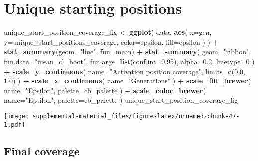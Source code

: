 \documentclass[]{book}
\newenvironment{Shaded}{\begin{snugshade}}{\end{snugshade}}
\newcommand{\DataTypeTok}[1]{\textcolor[rgb]{0.13,0.29,0.53}{#1}}
\newcommand{\DecValTok}[1]{\textcolor[rgb]{0.00,0.00,0.81}{#1}}
\newcommand{\FloatTok}[1]{\textcolor[rgb]{0.00,0.00,0.81}{#1}}
\newcommand{\KeywordTok}[1]{\textcolor[rgb]{0.13,0.29,0.53}{\textbf{#1}}}
\newcommand{\NormalTok}[1]{#1}
\newcommand{\OperatorTok}[1]{\textcolor[rgb]{0.81,0.36,0.00}{\textbf{#1}}}
\newcommand{\StringTok}[1]{\textcolor[rgb]{0.31,0.60,0.02}{#1}}
\begin{document}
\hypertarget{unique-starting-positions-3}{%
\section{Unique starting positions}\label{unique-starting-positions-3}}

\begin{Shaded}
\begin{Highlighting}[]
\NormalTok{unique_start_position_coverage_fig <-}\StringTok{ }\KeywordTok{ggplot}\NormalTok{(}
\NormalTok{    data,}
    \KeywordTok{aes}\NormalTok{(}
      \DataTypeTok{x=}\NormalTok{gen,}
      \DataTypeTok{y=}\NormalTok{unique_start_positions_coverage,}
      \DataTypeTok{color=}\NormalTok{epsilon,}
      \DataTypeTok{fill=}\NormalTok{epsilon}
\NormalTok{    )}
\NormalTok{  ) }\OperatorTok{+}
\StringTok{  }\KeywordTok{stat_summary}\NormalTok{(}\DataTypeTok{geom=}\StringTok{"line"}\NormalTok{, }\DataTypeTok{fun=}\NormalTok{mean) }\OperatorTok{+}
\StringTok{  }\KeywordTok{stat_summary}\NormalTok{(}
    \DataTypeTok{geom=}\StringTok{"ribbon"}\NormalTok{,}
    \DataTypeTok{fun.data=}\StringTok{"mean_cl_boot"}\NormalTok{,}
    \DataTypeTok{fun.args=}\KeywordTok{list}\NormalTok{(}\DataTypeTok{conf.int=}\FloatTok{0.95}\NormalTok{),}
    \DataTypeTok{alpha=}\FloatTok{0.2}\NormalTok{,}
    \DataTypeTok{linetype=}\DecValTok{0}
\NormalTok{  ) }\OperatorTok{+}
\StringTok{  }\KeywordTok{scale_y_continuous}\NormalTok{(}
    \DataTypeTok{name=}\StringTok{"Activation position coverage"}\NormalTok{,}
    \DataTypeTok{limits=}\KeywordTok{c}\NormalTok{(}\FloatTok{0.0}\NormalTok{, }\FloatTok{1.0}\NormalTok{)}
\NormalTok{  ) }\OperatorTok{+}
\StringTok{  }\KeywordTok{scale_x_continuous}\NormalTok{(}
    \DataTypeTok{name=}\StringTok{"Generations"}
\NormalTok{  ) }\OperatorTok{+}
\StringTok{  }\KeywordTok{scale_fill_brewer}\NormalTok{(}
    \DataTypeTok{name=}\StringTok{"Epsilon"}\NormalTok{,}
    \DataTypeTok{palette=}\NormalTok{cb_palette}
\NormalTok{  ) }\OperatorTok{+}
\StringTok{  }\KeywordTok{scale_color_brewer}\NormalTok{(}
    \DataTypeTok{name=}\StringTok{"Epsilon"}\NormalTok{,}
    \DataTypeTok{palette=}\NormalTok{cb_palette}
\NormalTok{  )}
\NormalTok{unique_start_position_coverage_fig}
\end{Highlighting}
\end{Shaded}

\texttt{[image: supplemental-material\_files/figure-latex/unnamed-chunk-47-1.pdf]}

\hypertarget{final-coverage}{%
\subsection{Final coverage}\label{final-coverage}}
\end{document}
